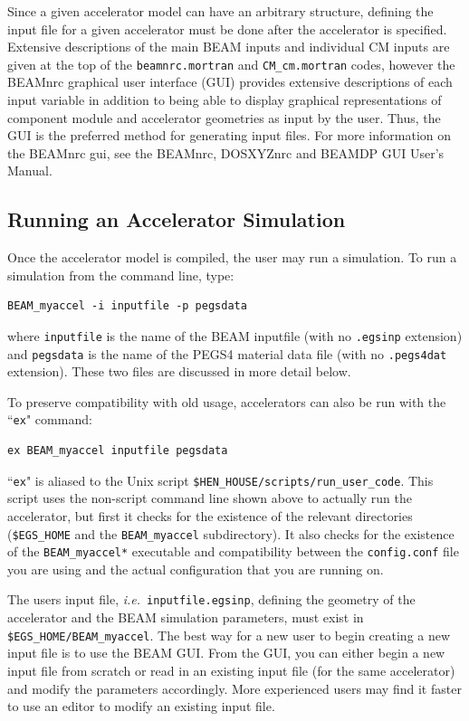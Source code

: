 \documentclass[12pt,twoside]{article}
\newcommand{\ie}{{\em i.e.}}
\begin{document}
Since a given accelerator model can have an arbitrary structure,
defining the input file for a given accelerator must be done after the
accelerator is specified.
Extensive descriptions of the main BEAM inputs and individual CM inputs
are given at the top of the {\tt beamnrc.mortran} and {\tt CM\_cm.mortran}
codes, however the BEAMnrc graphical user interface (GUI) provides
extensive descriptions of each input variable in addition
to being able to display graphical representations of component module and
accelerator geometries as input by the user.
Thus, the GUI is the preferred method for generating
input files.  For more information on the BEAMnrc gui, see the BEAMnrc,
DOSXYZnrc and
BEAMDP GUI User's Manual\cite{TR99}.
 

\subsection{Running an Accelerator Simulation}

Once the accelerator model is compiled, the user may run a simulation.
To run a simulation from the command line, type:
\begin{verbatim}
BEAM_myaccel -i inputfile -p pegsdata
\end{verbatim}
where {\tt inputfile} is the name of the BEAM inputfile (with no
{\tt .egsinp} extension) and {\tt pegsdata} is the name of the PEGS4
material data file (with no {\tt .pegs4dat} extension).  These two
files are discussed in more detail below.

To preserve compatibility with old usage, accelerators can also be run
with the ``{\tt ex}" command:
\begin{verbatim}
ex BEAM_myaccel inputfile pegsdata
\end{verbatim}
``{\tt ex}" is aliased to the Unix script {\tt \$HEN\_HOUSE/scripts/run\_user\_code}.  This script uses the non-script command line shown above to
actually run the accelerator, but first it checks for the existence of
the relevant directories ({\tt \$EGS\_HOME} and the {\tt BEAM\_myaccel}
subdirectory).  It also
checks for the existence of the
{\tt BEAM\_myaccel*} executable and compatibility between the
{\tt config.conf} file you are using and the actual configuration that
you are running on.

The users input file, \ie\ \verb+inputfile.egsinp+, defining the geometry
of the accelerator and the BEAM simulation parameters, must exist
in \verb+$EGS_HOME/BEAM_myaccel+.  The best way for a new user to begin
creating a new input file is to use the BEAM GUI\cite{TR99}.
   From the GUI, you can either begin a new
input file from scratch or read in an existing input file (for the same
accelerator) and modify the parameters accordingly.  More experienced users
may find it faster to use an editor to modify an existing input file.
\end{document}
